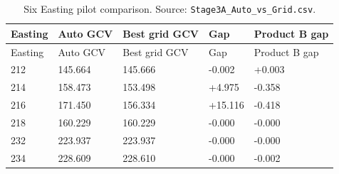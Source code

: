 \begin{longtable}{@{}p{1.8cm}p{2.8cm}p{3.2cm}p{2.0cm}p{2.5cm}@{}}
\caption{Six Easting pilot comparison. Source: \texttt{Stage3A\_Auto\_vs\_Grid.csv}.}\label{tab:six-easting-pilot-comparison}\\
\toprule
Easting & Auto GCV & Best grid GCV & Gap & Product B gap\\
\midrule
\endfirsthead
\toprule
Easting & Auto GCV & Best grid GCV & Gap & Product B gap\\
\midrule
\endhead
212 & 145.664 & 145.666 & -0.002 & +0.003\\
214 & 158.473 & 153.498 & +4.975 & -0.358\\
216 & 171.450 & 156.334 & +15.116 & -0.418\\
218 & 160.229 & 160.229 & -0.000 & -0.000\\
232 & 223.937 & 223.937 & -0.000 & -0.000\\
234 & 228.609 & 228.610 & -0.000 & -0.002\\
\bottomrule
\end{longtable}
